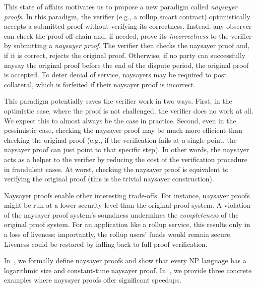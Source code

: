 This state of affairs motivates us to propose a new paradigm called \emph{naysayer proofs}. In this paradigm, the verifier (e.g., a rollup smart contract) optimistically accepts a submitted proof without verifying its correctness. Instead, any observer can check the proof off-chain and, if needed, prove its \emph{incorrectness} to the verifier by submitting a \emph{naysayer proof}. The verifier then checks the naysayer proof and, if it is correct, rejects the original proof.
Otherwise, if no party can successfully naysay the original proof before the end of the dispute period, the original proof is accepted.
To deter denial of service, naysayers may be required to post collateral, which is forfeited if their naysayer proof is incorrect.

This paradigm potentially saves the verifier work in two ways. 
First, in the optimistic case, where the proof is not challenged, the verifier does no work at all. We expect this to almost always be the case in practice. Second, even in the pessimistic case, checking the naysayer proof may be much more efficient than checking the original proof (e.g., if the verification fails at a single point, the naysayer proof can just point to that specific step). In other words, the naysayer acts as a helper to the verifier by reducing the cost of the verification procedure in fraudulent cases. At worst, checking the naysayer proof is equivalent to verifying the original proof (this is the trivial naysayer construction).

Naysayer proofs enable other interesting trade-offs. 
For instance, naysayer proofs might be run at a lower security level than the original proof system.
A violation of the naysayer proof system's soundness undermines the \emph{completeness} of the original proof system. %
For an application like a rollup service, this results only in a loss of liveness; importantly, the rollup users' funds would remain secure. 
Liveness could be restored by falling back to full proof verification.


In~, we formally define naysayer proofs and show that every NP language has a logarithmic size and constant-time naysayer proof. In~, we provide three concrete examples where naysayer proofs offer significant speedups. %
